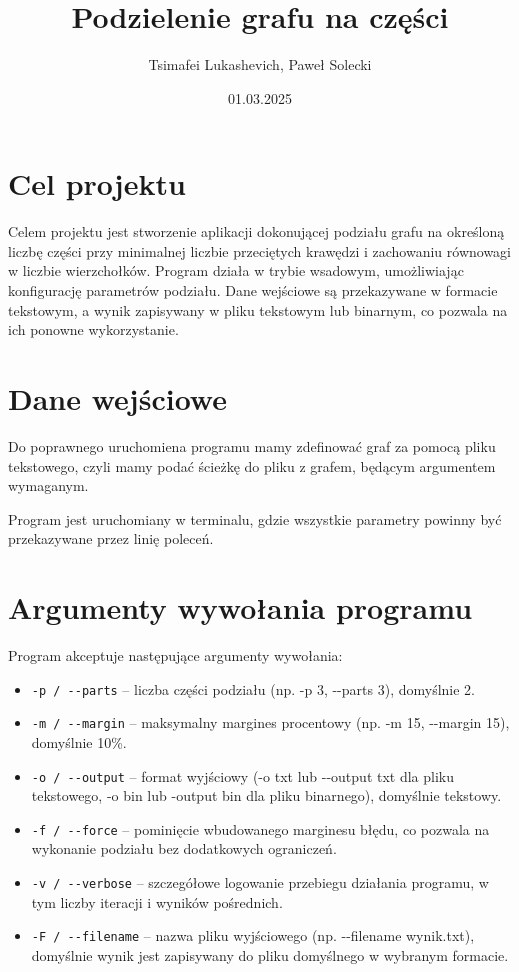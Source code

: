 \documentclass[]{article}
\title{Podzielenie grafu na części}
\author{Tsimafei Lukashevich, Paweł Solecki}
\date{01.03.2025}
\begin{document}
\maketitle


\section{Cel projektu}\label{header-n231}

Celem projektu jest stworzenie aplikacji dokonującej podziału grafu na określoną liczbę części przy minimalnej liczbie przeciętych krawędzi i zachowaniu równowagi w liczbie wierzchołków. Program działa w trybie wsadowym, umożliwiając konfigurację parametrów podziału. Dane wejściowe są przekazywane w formacie tekstowym, a wynik zapisywany w pliku tekstowym lub binarnym, co pozwala na ich ponowne wykorzystanie.

\section{Dane wejściowe}\label{header-n233}

Do poprawnego uruchomiena programu mamy zdefinować graf za pomocą pliku tekstowego, czyli mamy podać ścieżkę do pliku z grafem, będącym argumentem wymaganym.

Program jest uruchomiany w terminalu, gdzie wszystkie parametry powinny być przekazywane przez linię poleceń.

\section{Argumenty wywołania programu}\label{header-n256}

Program akceptuje następujące argumenty wywołania:

\begin{itemize}
\item
    \texttt{-p / -\/-parts} – liczba części podziału (np. -p 3, -\/-parts 3), domyślnie 2.
\item
    \texttt{-m / -\/-margin} – maksymalny margines procentowy (np. -m 15, -\/-margin 15), domyślnie 10\%.
\item
    \texttt{-o / -\/-output} – format wyjściowy (-o txt lub -\/-output txt dla pliku tekstowego, -o bin lub -\/output bin dla pliku binarnego), domyślnie tekstowy.
\item
    \texttt{-f / -\/-force} – pominięcie wbudowanego marginesu błędu, co pozwala na wykonanie podziału bez dodatkowych ograniczeń.
\item
    \texttt{-v / -\/-verbose} – szczegółowe logowanie przebiegu działania programu, w tym liczby iteracji i wyników pośrednich.
\item
    \texttt{-F / -\/-filename} – nazwa pliku wyjściowego (np. -\/-filename wynik.txt), domyślnie wynik jest zapisywany do pliku domyślnego w wybranym formacie.
\end{itemize}
\end{document}
